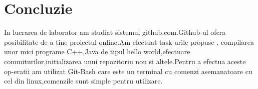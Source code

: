 \section*{Concluzie}

In lucrarea de laborator am studiat sistemul  github.com.Github-ul ofera posibilitate de a tine proiectul online.Am efectuat task-urile propuse , compilarea unor mici programe C++,Java de tipul hello world,efectuare commiturilor,initializarea unui repozitoriu nou si altele.Pentru a efectua aceste op-eratii am utilizat Git-Bash care este un terminal cu comenzi asemanatoare cu cel din linux,comenzile sunt simple pentru utilizare.

\clearpage
